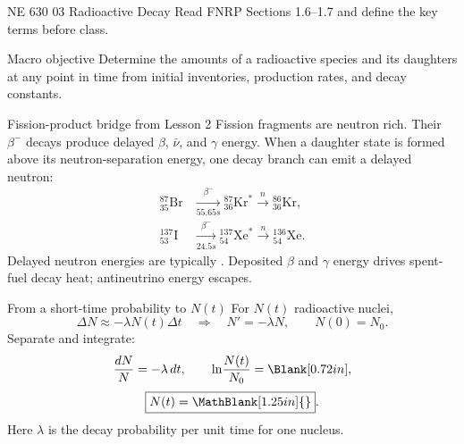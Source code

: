 \HandoutSetup
  {NE 630}
  {03}
  {Radioactive Decay}
  {Read FNRP Sections 1.6--1.7 and define the key terms before class.}


\MakeHandoutTitle

\begin{handoutcolumns}

\begin{fixedbox}{Macro objective}
Determine the amounts of a radioactive species and its daughters at any point
in time from initial inventories, production rates, and decay constants.
\end{fixedbox}



\begin{fixedbox}{Fission-product bridge from Lesson 2}
Fission fragments are neutron rich. Their $\beta^-$ decays produce delayed
$\beta$, $\bar\nu$, and $\gamma$ energy. When a daughter state is formed above
its neutron-separation energy, one decay branch can emit a delayed neutron:
\scriptsize
\begin{align*}
{}^{87}_{35}\mathrm{Br}
 &\xrightarrow[55.65\unit{s}]{\beta^-}
 {}^{87}_{36}\mathrm{Kr}^{*}
 \xrightarrow{n}{}^{86}_{36}\mathrm{Kr},\\[-1pt]
{}^{137}_{53}\mathrm{I}
 &\xrightarrow[24.5\unit{s}]{\beta^-}
 {}^{137}_{54}\mathrm{Xe}^{*}
 \xrightarrow{n}{}^{136}_{54}\mathrm{Xe}.
\end{align*}
\normalsize
Delayed neutron energies are typically
\RevealBlank[0.80in]{}.  
Deposited $\beta$ and $\gamma$ energy
drives spent-fuel decay heat; antineutrino energy escapes.
\end{fixedbox}


\begin{boardbox}{From a short-time probability to $N(t)$}
For $N(t)$ radioactive nuclei,
\[
 \Delta N\approx-\lambda N(t)\Delta t
 \quad\Longrightarrow\quad
 \boxed{N'=-\lambda N},\qquad N(0)=N_0.
\]
Separate and integrate:
\[
 \frac{dN}{N}=-\lambda\,dt,
 \qquad
 \ln\!\frac{N(t)}{N_0}=\Blank[0.72in],
\]
\[
 \boxed{N(t)=\MathBlank[1.25in]{}}.
\]
Here $\lambda$ is the decay probability per unit time for one nucleus.
\end{boardbox}


\end{handoutcolumns}
